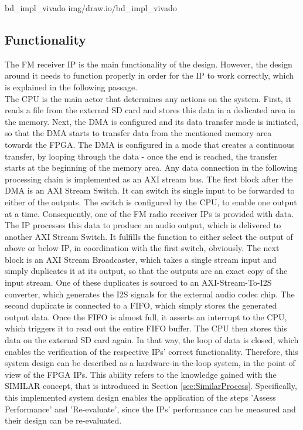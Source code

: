 {bd_impl_vivado} {img/draw.io/bd_impl_vivado}

\subsection{Functionality}

The FM receiver IP is the main functionality of the design.
However, the design around it needs to function properly in order for the IP to work correctly, which is explained in the following passage.\\

The CPU is the main actor that determines any actions on the system.
First, it reads a file from the external SD card and stores this data in a dedicated area in the memory.
Next, the DMA is configured and its data transfer mode is initiated, so that the DMA starts to transfer data from the mentioned memory area towards the FPGA.
The DMA is configured in a mode that creates a continuous transfer, by looping through the data - once the end is reached, the transfer starts at the beginning of the memory area.
Any data connection in the following processing chain is implemented as an AXI stream bus.
The first block after the DMA is an AXI Stream Switch.
It can switch its single input to be forwarded to either of the outputs.
The switch is configured by the CPU, to enable one output at a time.
Consequently, one of the FM radio receiver IPs is provided with data.
The IP processes this data to produce an audio output, which is delivered to another AXI Stream Switch.
It fulfills the function to either select the output of above or below IP, in coordination with the first switch, obviously.
The next block is an AXI Stream Broadcaster, which takes a single stream input and simply duplicates it at its output, so that the outputs are an exact copy of the input stream.
One of these duplicates is sourced to an AXI-Stream-To-I2S converter, which generates the I2S signals for the external audio codec chip.
The second duplicate is connected to a FIFO, which simply stores the generated output data.
Once the FIFO is almost full, it asserts an interrupt to the CPU, which triggers it to read out the entire FIFO buffer.
The CPU then stores this data on the external SD card again.
In that way, the loop of data is closed, which enables the verification of the respective IPs' correct functionality.
Therefore, this system design can be described as a hardware-in-the-loop system, in the point of view of the FPGA IPs.
This ability refers to the knowledge gained with the SIMILAR concept, that is introduced in Section \ref{sec:SimilarProcess}.
Specifically, this implemented system design enables the application of the steps 'Assess Performance' and 'Re-evaluate', since the IPs' performance can be measured and their design can be re-evaluated.\\

